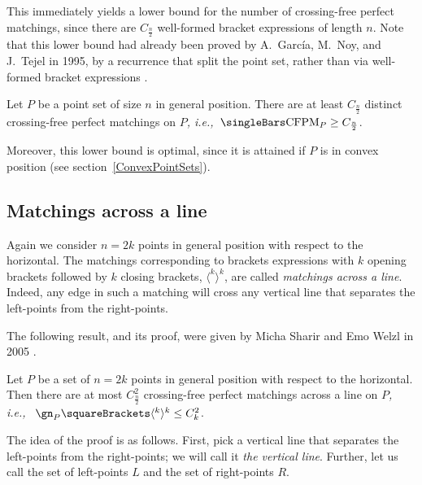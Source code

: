 \documentclass[10pt, a4paper, twoside]{basestyle}
\newcommand{\idest}{\emph{, i.e.,\ }}
\DeclareMathOperator{\CFPM}{CFPM}
\begin{document}
This immediately yields a lower bound for the number of crossing-free perfect matchings, since
there are $C_{\frac n 2}$ well-formed bracket expressions of length $n$.
Note that this lower bound had already been proved by A.~García, M.~Noy, and J.~Tejel in 1995,
by a recurrence that split the point set, rather than via well-formed bracket expressions
\cite{GarciaNoyTejel2000}.
\begin{corollary}
Let $P$ be a point set of size $n$ in general position. There are at least $C_{\frac n 2}$ distinct
crossing-free perfect matchings on $P$\idest $\Cardinality{\CFPM_P} \geq C_{\frac n 2}$.
\end{corollary}
Moreover, this lower bound is optimal, since it is attained if $P$ is in convex position (see
section~\ref{ConvexPointSets}).
\subsection{Matchings across a line}
Again we consider $n=2k$ points in general position with respect to the horizontal.
The matchings corresponding to brackets expressions with $k$ opening brackets followed
by $k$ closing brackets, $\langle^k\rangle^k$, are called \emph{matchings
across a line}. Indeed, any edge in such a matching will cross any vertical line that separates
the left-points from the right-points.

The following result, and its proof, were given by Micha Sharir and Emo Welzl in 2005 \cite{SharirWelzl2006}.
\NoEndMark
\begin{theorem}
Let $P$ be a set of $n=2k$ points in general position with respect to the horizontal.
Then there are at most $C_{\frac n 2}^2$ crossing-free perfect matchings across a line on $P$\idest
$\gn_P\of {\langle^k\rangle^k} \leq C_k^2$.
\end{theorem}
The idea of the proof is as follows.
First, pick a vertical line that separates the left-points from the right-points;
we will call it \emph{the vertical line}.
Further, let us call the set of left-points $L$ and the set of right-points $R$.
\end{document}
